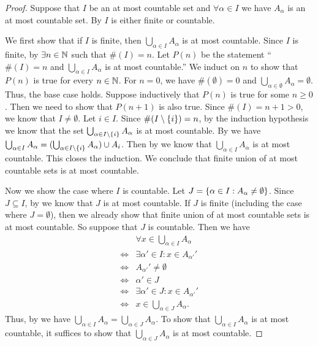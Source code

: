 \begin{proof}
  Suppose that \(I\) be an at most countable set and \(\forall \alpha \in I\) we have \(A_{\alpha}\) is an at most countable set.
  By  \(I\) is either finite or countable.

  We first show that if \(I\) is finite, then \(\bigcup_{\alpha \in I} A_{\alpha}\) is at most countable.
  Since \(I\) is finite, by  \(\exists n \in \mathbb{N}\) such that \(\#(I) = n\).
  Let \(P(n)\) be the statement ``\(\#(I) = n\) and \(\bigcup_{\alpha \in I} A_{\alpha}\) is at most countable.''
  We induct on \(n\) to show that \(P(n)\) is true for every \(n \in \mathbb{N}\).
  For \(n = 0\), we have \(\#(\emptyset) = 0\) and \(\bigcup_{\alpha \in \emptyset} A_{\alpha} = \emptyset\).
  Thus, the base case holds.
  Suppose inductively that \(P(n)\) is true for some \(n \geq 0\).
  Then we need to show that \(P(n + 1)\) is also true.
  Since \(\#(I) = n + 1 > 0\), we know that \(I \neq \emptyset\).
  Let \(i \in I\).
  Since \(\#(I \setminus \left\lbrace i\right\rbrace) = n\), by the induction hypothesis we know that the set \(\bigcup_{\alpha \in I \setminus \left\lbrace i\right\rbrace} A_{\alpha}\) is at most countable.
  By  we have \(\bigcup_{\alpha \in I} A_{\alpha} = (\bigcup_{\alpha \in I \setminus \left\lbrace i\right\rbrace} A_{\alpha}) \cup A_i\).
  Then by  we know that \(\bigcup_{\alpha \in I} A_{\alpha}\) is at most countable.
  This closes the induction.
  We conclude that finite union of at most countable sets is at most countable.

  Now we show the case where \(I\) is countable.
  Let \(J = \left\lbrace\alpha \in I : A_{\alpha} \neq \emptyset\right\rbrace\).
  Since \(J \subseteq I\), by  we know that \(J\) is at most countable.
  If \(J\) is finite (including the case where \(J = \emptyset\)), then we already show that finite union of at most countable sets is at most countable.
  So suppose that \(J\) is countable.
  Then we have
  \begin{align*}
         & \forall x \in \bigcup_{\alpha \in I} A_{\alpha} \\
    \iff & \exists \alpha' \in I : x \in A_{\alpha'}'      \\
    \iff & A_{\alpha'}' \neq \emptyset                     \\
    \iff & \alpha' \in J                                   \\
    \iff & \exists \alpha' \in J : x \in A_{\alpha'}'      \\
    \iff & x \in \bigcup_{\alpha \in J} A_{\alpha}.
  \end{align*}
  Thus, by  we have \(\bigcup_{\alpha \in I} A_{\alpha} = \bigcup_{\alpha \in J} A_{\alpha}\).
  To show that \(\bigcup_{\alpha \in I} A_{\alpha}\) is at most countable, it suffices to show that \(\bigcup_{\alpha \in J} A_{\alpha}\) is at most countable.


\end{proof}
